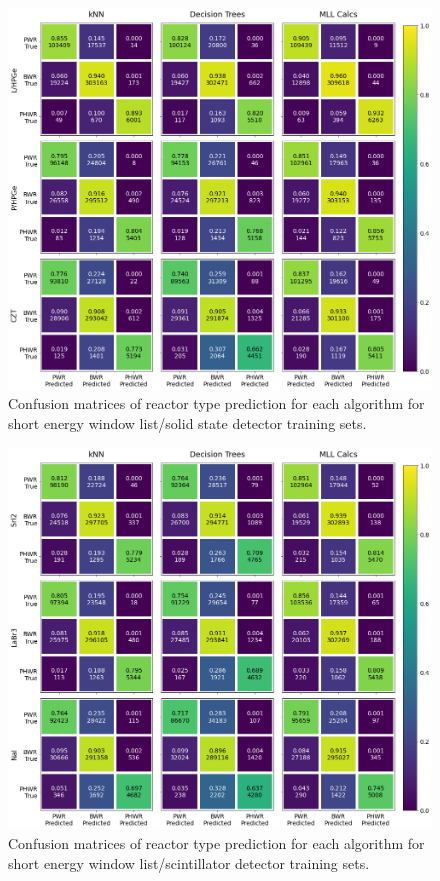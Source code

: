 \begin{figure}[!htb]
  \centering
  \includegraphics[width=\textwidth]{./chapters/exp2/confusion_matrix_soliddets_short.png}
  \caption{Confusion matrices of reactor type prediction for each algorithm 
           for short energy window list/solid state detector training sets.}
  \label{fig:cm_short1}
\end{figure}

\begin{figure}[!htb]
  \centering
  \includegraphics[width=\textwidth]{./chapters/exp2/confusion_matrix_scintdets_short.png}
  \caption{Confusion matrices of reactor type prediction for each algorithm 
           for short energy window list/scintillator detector training sets.}
  \label{fig:cm_short2}
\end{figure}

